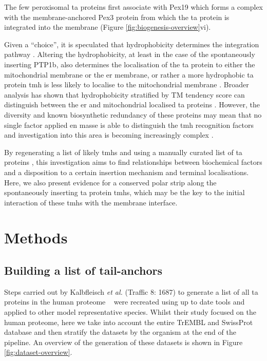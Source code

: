 The few peroxisomal \gls{ta} proteins first associate with Pex19 which forms a complex with the membrane\--anchored Pex3 protein from which the \gls{ta} protein is integrated into the membrane \cite{Chen2014, Yagita2013, Costello2017}(Figure \ref{fig:biogenesis-overview}vi).

Given a ``choice'', it is speculated that hydrophobicity determines the integration pathway \cite{Costa2018, Rabu2008, Rabu2009}.
Altering the hydrophobicity, at least in the case of the spontaneously inserting PTP1b, also determines the localisation of the \gls{ta} protein to either the mitochondrial membrane or the \gls{er} membrane, or rather a more hydrophobic \gls{ta} protein \gls{tmh} is less likely to localise to the mitochondrial membrane \cite{Fueller2015}.
Broader analysis has shown that hydrophobicity \cite{White1999} stratified by TM tendency score \cite{Zhao2006} can distinguish between the \gls{er} and mitochondrial localised \gls{ta} proteins \cite{Guna2018}.
However, the diversity and known biosynthetic redundancy of these proteins may mean that no single factor applied en masse is able to distinguish the \gls{tmh} recognition factors and investigation into this area is becoming increasingly complex \cite{Guna2018}.

By regenerating a list of likely \gls{tmh}s \cite{Kalbfleisch2007} and using a manually curated list of \gls{ta} proteins \cite{TheUniProtConsortium2014}, this investigation aims to find relationships between biochemical factors and a disposition to a certain insertion mechanism and terminal localisations.
Here, we also present evidence for a conserved polar strip along the spontaneously inserting \gls{ta} protein \gls{tmh}s, which may be the key to the initial interaction of these \gls{tmh}s with the membrane interface.

\section{Methods}

\subsection{Building a list of tail-anchors}
Steps carried out by Kalbfleisch \textit{et al.} (Traffic 8: 1687) to generate a list of all \gls{ta} proteins in the human proteome ~\cite{Kalbfleisch2007} were recreated using up to date tools and applied to other model representative species.
Whilst their study focused on the human proteome, here we take into account the entire TrEMBL and SwissProt database and then stratify the datasets by the organism at the end of the pipeline.
An overview of the generation of these datasets is shown in Figure \ref{fig:dataset-overview}.

